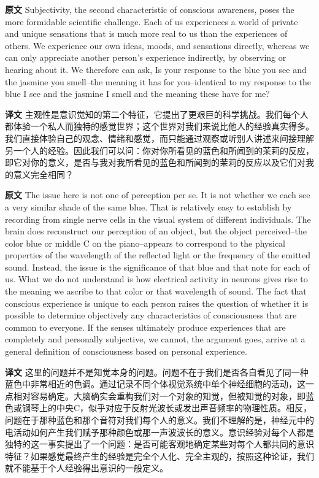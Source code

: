\documentclass[UTF8,zihao=-4]{ctexart}
\newcommand{\BodyFont}{\fontsize{10.5pt}{15.5pt}\selectfont}
\newcommand{\origlabel}{\textbf{原文}\quad}
\newcommand{\translabel}{\textbf{译文}\quad}
\newenvironment{enblock}{\par\noindent\begingroup\BodyFont\origlabel}{\par\endgroup}
\newenvironment{zhblock}{\par\noindent\begingroup\BodyFont\translabel}{\par\endgroup\vspace{0.35em}}
\begin{document}
\begin{enblock}
Subjectivity, the second characteristic of conscious awareness, poses the more formidable scientific challenge. Each of us experiences a world of private and unique sensations that is much more real to us than the experiences of others. We experience our own ideas, moods, and sensations directly, whereas we can only appreciate another person's experience indirectly, by observing or hearing about it. We therefore can ask, Is your response to the blue you see and the jasmine you smell--the meaning it has for you--identical to my response to the blue I see and the jasmine I smell and the meaning these have for me?
\end{enblock}
\begin{zhblock}
主观性是意识觉知的第二个特征，它提出了更艰巨的科学挑战。我们每个人都体验一个私人而独特的感觉世界；这个世界对我们来说比他人的经验真实得多。我们直接体验自己的观念、情绪和感觉，而只能通过观察或听别人讲述来间接理解另一个人的经验。因此我们可以问：你对你所看见的蓝色和所闻到的茉莉的反应，即它对你的意义，是否与我对我所看见的蓝色和所闻到的茉莉的反应以及它们对我的意义完全相同？
\end{zhblock}

\begin{enblock}
The issue here is not one of perception per se. It is not whether we each see a very similar shade of the same blue. That is relatively easy to establish by recording from single nerve cells in the visual system of different individuals. The brain does reconstruct our perception of an object, but the object perceived--the color blue or middle C on the piano--appears to correspond to the physical properties of the wavelength of the reflected light or the frequency of the emitted sound. Instead, the issue is the significance of that blue and that note for each of us. What we do not understand is how electrical activity in neurons gives rise to the meaning we ascribe to that color or that wavelength of sound. The fact that conscious experience is unique to each person raises the question of whether it is possible to determine objectively any characteristics of consciousness that are common to everyone. If the senses ultimately produce experiences that are completely and personally subjective, we cannot, the argument goes, arrive at a general definition of consciousness based on personal experience.
\end{enblock}
\begin{zhblock}
这里的问题并不是知觉本身的问题。问题不在于我们是否各自看见了同一种蓝色中非常相近的色调。通过记录不同个体视觉系统中单个神经细胞的活动，这一点相对容易确定。大脑确实会重构我们对一个对象的知觉，但被知觉的对象，即蓝色或钢琴上的中央C，似乎对应于反射光波长或发出声音频率的物理性质。相反，问题在于那种蓝色和那个音符对我们每个人的意义。我们不理解的是，神经元中的电活动如何产生我们赋予那种颜色或那一声波波长的意义。意识经验对每个人都是独特的这一事实提出了一个问题：是否可能客观地确定某些对每个人都共同的意识特征？如果感觉最终产生的经验是完全个人化、完全主观的，按照这种论证，我们就不能基于个人经验得出意识的一般定义。\end{zhblock}
\end{document}
